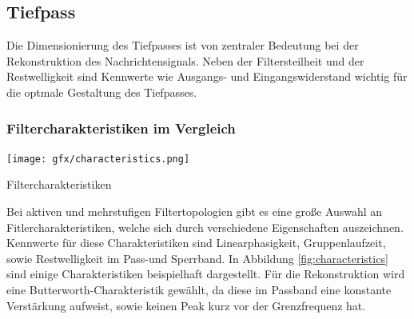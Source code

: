 \newpage
\subsection{Tiefpass}
Die Dimensionierung des Tiefpasses ist von zentraler Bedeutung bei der Rekonstruktion des Nachrichtensignals. Neben der Filtersteilheit und der Restwelligkeit sind Kennwerte wie Ausgangs- und Eingangswiderstand wichtig für die optmale Gestaltung des Tiefpasses.
\subsubsection{Filtercharakteristiken im Vergleich} 
\begin{floatingfigure}[r]{7cm}
	\texttt{[image: gfx/characteristics.png]}
	\caption{Filtercharakteristiken}
\label{fig:characteristics}
\end{floatingfigure}
\noindent
Bei aktiven und mehrstufigen Filtertopologien gibt es eine große Auswahl an Fitlercharakteristiken, welche sich durch verschiedene Eigenschaften auszeichnen. Kennwerte für diese Charakteristiken sind Linearphasigkeit, Gruppenlaufzeit, sowie Restwelligkeit im Pass-und Sperrband. In Abbildung \ref{fig:characteristics} sind einige Charakteristiken beispielhaft dargestellt. Für die Rekonstruktion wird eine Butterworth-Charakteristik gewählt, da diese im Passband eine konstante Verstärkung aufweist, sowie keinen Peak kurz vor der Grenzfrequenz hat.\\

